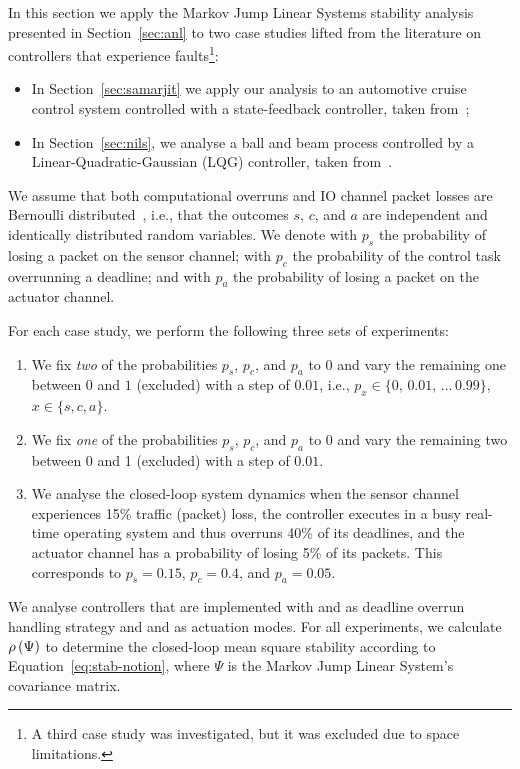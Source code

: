 In this section we apply the Markov Jump Linear Systems stability analysis presented in Section~\ref{sec:anl} to two case studies lifted from the literature on controllers that experience faults\footnote{A third case study was investigated, but it was excluded due to space limitations.}:
\begin{itemize}
    \item In Section~\ref{sec:samarjit} we apply our analysis to an automotive cruise control system controlled with a state-feedback controller, taken from~\cite{Ghosh:2018};
    \item In Section~\ref{sec:nils}, we analyse a ball and beam process controlled by a Linear-Quadratic-Gaussian (LQG) controller, taken from~\cite{Vreman:2022}.
\end{itemize}
We assume that both computational overruns and IO channel packet losses are Bernoulli distributed~\cite{Schenato:2007}, i.e., that the outcomes $s$, $c$, and $a$ are independent and identically distributed random variables.
We denote with $p_s$ the probability of losing a packet on the sensor channel; with $p_c$ the probability of the control task overrunning a deadline; and with $p_a$ the probability of losing a packet on the actuator channel.

For each case study, we perform the following three sets of experiments:
%
\begin{enumerate}[label=(\roman*)]
    \item \label{exp:twofixed} We fix \emph{two} of the probabilities $p_s$, $p_c$, and $p_a$ to $0$ and vary the remaining one between $0$ and $1$ (excluded) with a step of $0.01$, i.e., $p_x \in \{0,\,0.01,\,\dots\,0.99\}$, $x \in \{ s, c, a \}$.

    \item \label{exp:onefixed} We fix \emph{one} of the probabilities $p_s$, $p_c$, and $p_a$ to $0$ and vary the remaining two between 0 and 1 (excluded) with a step of $0.01$.

    \item \label{exp:nonefixed} We analyse the closed-loop system dynamics when the sensor channel experiences 15\% traffic (packet) loss, the controller executes in a busy real-time operating system and thus overruns 40\% of its deadlines, and the actuator channel has a probability of losing 5\% of its packets.
        This corresponds to $p_s=0.15$, $p_c=0.4$, and $p_a = 0.05$.
\end{enumerate}
%
We analyse controllers that are implemented with \tK{} and \tS{} as deadline overrun handling strategy and \tZ{} and \tH{} as actuation modes.
For all experiments, we calculate $\rho\left( \Psi \right)$ to determine the closed-loop mean square stability according to Equation~\eqref{eq:stab-notion}, where $\Psi$ is the Markov Jump Linear System's covariance matrix.

